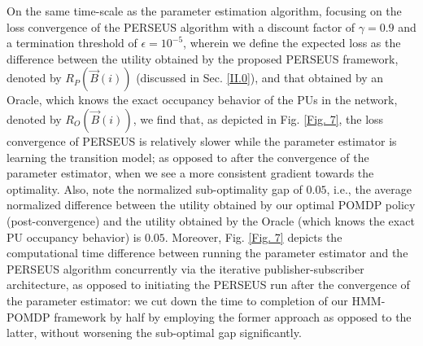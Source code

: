 \documentclass[10pt, twocolumn]{IEEEtran}
\begin{document}
On the same time-scale as the parameter estimation algorithm, focusing on the loss convergence of the PERSEUS algorithm with a discount factor of $\gamma{=}0.9$ and a termination threshold of $\epsilon{=}10^{-5}$, wherein we define the expected loss as the difference between the utility obtained by the proposed PERSEUS framework, denoted by $R_{P}(\vec{B}(i))$ (discussed in Sec. \ref{II.0}), and that obtained by an Oracle, which knows the exact occupancy behavior of the PUs in the network, denoted by $R_{O}(\vec{B}(i))$, we find that, as depicted in Fig. \ref{Fig. 7}, the loss convergence of PERSEUS is relatively slower while the parameter estimator is learning the transition model; as opposed to after the convergence of the parameter estimator, when we see a more consistent gradient towards the optimality. Also, note the normalized sub-optimality gap of $0.05$, i.e., the average normalized difference between the utility obtained by our optimal POMDP policy (post-convergence) and the utility obtained by the Oracle (which knows the exact PU occupancy behavior) is $0.05$. Moreover, Fig. \ref{Fig. 7} depicts the computational time difference between running the parameter estimator and the PERSEUS algorithm concurrently via the iterative publisher-subscriber architecture, as opposed to initiating the PERSEUS run after the convergence of the parameter estimator: we cut down the time to completion of our HMM-POMDP framework by half by employing the former approach as opposed to the latter, without worsening the sub-optimal gap significantly.
\end{document}
